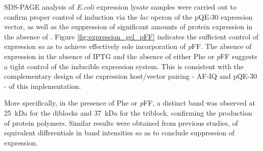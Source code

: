 \begin{refsection}
SDS-PAGE analysis of \emph{E.coli} expression lysate samples were carried out to
confirm proper control of induction via the \emph{lac} operon of the pQE-30
expression vector, as well as the suppression of significant amounts of protein
expression in the absence of .  Figure
\ref{fig:expression_gel_pFF} indicates the sufficient control of expression so
as to achieve effectively sole incorporation of \emph{p}FF. The absence of
expression in the absence of IPTG and the absence of either Phe or \emph{p}FF
suggests a tight control of the inducible expression system. This is consistent
with the complementary design of the expression host/vector pairing - AF-IQ and
pQE-30 - of this implementation.

More specifically, in the presence of Phe or \emph{p}FF, a distinct band was
observed at \SI{25}{\kilo\dalton} for the diblocks and \SI{37}{\kilo\dalton} for
the triblock, confirming the production of protein polymers. Similar results
were obtained from previous studies, of equivalent differentials in band
intensities so as to conclude suppression of expression.


\end{refsection}
